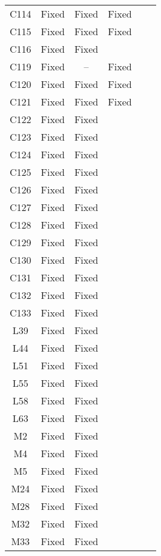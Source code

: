 \begin{table}[!t]
{\begin{tabular}{|c|c|c|c|c|c|}
C114              & Fixed     & Fixed     &Fixed   \\
C115              & Fixed     & Fixed     &Fixed   \\
C116              & Fixed     &Fixed   \\
C119              & Fixed     & --        &Fixed   \\
C120              & Fixed     & Fixed     &Fixed   \\
C121              & Fixed     & Fixed     &Fixed   \\
C122              & Fixed     &Fixed   \\
C123              & Fixed     &Fixed   \\
C124              & Fixed     &Fixed   \\
C125              & Fixed     &Fixed   \\
C126              & Fixed     &Fixed   \\
C127              & Fixed     &Fixed   \\
C128              & Fixed     &Fixed   \\
C129              & Fixed     &Fixed   \\
C130              & Fixed     &Fixed   \\
C131              & Fixed     &Fixed   \\
C132              & Fixed     &Fixed   \\
C133              & Fixed     &Fixed   \\
\hline
L39               & Fixed     &Fixed   \\
L44               & Fixed     &Fixed   \\
L51               & Fixed     &Fixed   \\
L55               & Fixed     &Fixed   \\
L58               & Fixed     &Fixed   \\
L63               & Fixed     &Fixed   \\
\hline
M2                & Fixed     &Fixed   \\
M4                & Fixed     &Fixed   \\
M5                & Fixed     &Fixed   \\
M24               & Fixed     &Fixed   \\
M28               & Fixed     &Fixed   \\
M32               & Fixed     &Fixed   \\
M33               & Fixed     &Fixed   \\

\end{tabular}}
\end{table}
